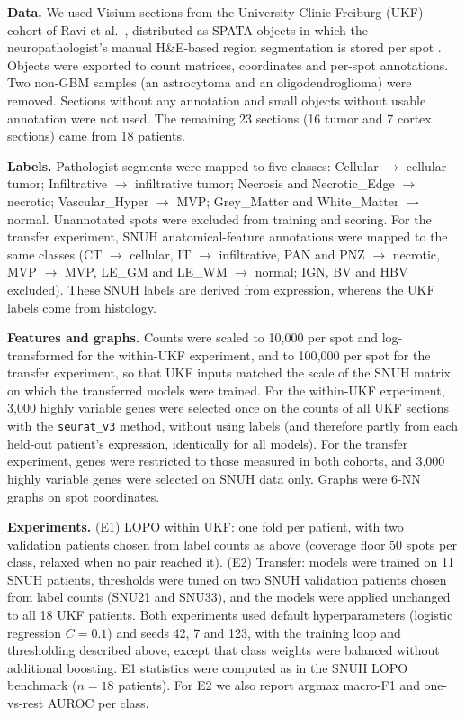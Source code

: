 \documentclass[11pt,letterpaper]{article}
\begin{document}
\textbf{Data.} We used Visium sections from the University Clinic Freiburg (UKF) cohort of Ravi et al.\ \cite{ravi2022,ravi2022data,heiland2024data}, distributed as SPATA objects in which the neuropathologist's manual H\&E-based region segmentation is stored per spot \cite{ritter2025}. Objects were exported to count matrices, coordinates and per-spot annotations. Two non-GBM samples (an astrocytoma and an oligodendroglioma) were removed. Sections without any annotation and small objects without usable annotation were not used. The remaining 23 sections (16 tumor and 7 cortex sections) came from 18 patients.

\textbf{Labels.} Pathologist segments were mapped to five classes: Cellular $\rightarrow$ cellular tumor; Infiltrative $\rightarrow$ infiltrative tumor; Necrosis and Necrotic\_Edge $\rightarrow$ necrotic; Vascular\_Hyper $\rightarrow$ MVP; Grey\_Matter and White\_Matter $\rightarrow$ normal. Unannotated spots were excluded from training and scoring. For the transfer experiment, SNUH anatomical-feature annotations were mapped to the same classes (CT $\rightarrow$ cellular, IT $\rightarrow$ infiltrative, PAN and PNZ $\rightarrow$ necrotic, MVP $\rightarrow$ MVP, LE\_GM and LE\_WM $\rightarrow$ normal; IGN, BV and HBV excluded). These SNUH labels are derived from expression, whereas the UKF labels come from histology.

\textbf{Features and graphs.} Counts were scaled to 10{,}000 per spot and log-transformed for the within-UKF experiment, and to 100{,}000 per spot for the transfer experiment, so that UKF inputs matched the scale of the SNUH matrix on which the transferred models were trained. For the within-UKF experiment, 3{,}000 highly variable genes were selected once on the counts of all UKF sections with the \texttt{seurat\_v3} method, without using labels (and therefore partly from each held-out patient's expression, identically for all models). For the transfer experiment, genes were restricted to those measured in both cohorts, and 3{,}000 highly variable genes were selected on SNUH data only. Graphs were 6-NN graphs on spot coordinates.

\textbf{Experiments.} (E1) LOPO within UKF: one fold per patient, with two validation patients chosen from label counts as above (coverage floor 50 spots per class, relaxed when no pair reached it). (E2) Transfer: models were trained on 11 SNUH patients, thresholds were tuned on two SNUH validation patients chosen from label counts (SNU21 and SNU33), and the models were applied unchanged to all 18 UKF patients. Both experiments used default hyperparameters (logistic regression $C = 0.1$) and seeds 42, 7 and 123, with the training loop and thresholding described above, except that class weights were balanced without additional boosting. E1 statistics were computed as in the SNUH LOPO benchmark ($n = 18$ patients). For E2 we also report argmax macro-F1 and one-vs-rest AUROC per class.
\end{document}
